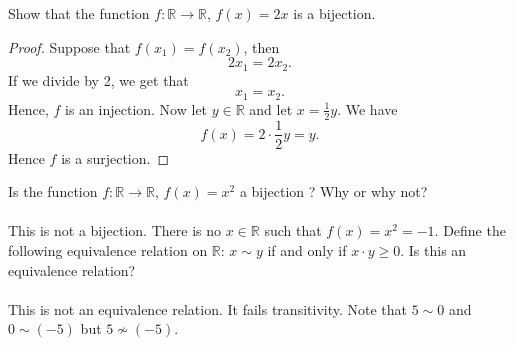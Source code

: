 \documentclass[11pt]{exam}
\theoremstyle{definition}
\begin{document}
\begin{questions}
\question Show that the function $f:\mathbb{R}\rightarrow \mathbb{R}$, $f(x)=2x$  is a bijection. 
\begin{proof} Suppose that $f(x_1)=f(x_2)$, then 
\[2x_1=2x_2.\]
If we divide by 2, we get that 
\[x_1=x_2.\] Hence, $f$ is an injection. Now let $y\in \mathbb{R}$ and let $x=\frac{1}{2}y$. We have 
\[f(x)=2\cdot \frac{1}{2}y= y.\]
Hence $f$ is a surjection. 
\end{proof}
\vfill
\question Is the function $f:\mathbb{R}\rightarrow \mathbb{R}$, $f(x)=x^2$ a bijection ? Why or why not? \\
\ \\
This is not a bijection. There is no $x\in \mathbb{R}$ such that $f(x)=x^2=-1$. 
\vspace{2.5 in}
\newpage
Define the following equivalence relation on $\mathbb{R}$: $x\sim y$ if and only if $x\cdot y\geq 0$. Is this an equivalence relation?\\
\ \\
This is not an equivalence relation. It fails transitivity. Note that $5\sim 0$ and $0\sim (-5)$ but $5\not \sim (-5)$.
\end{questions}
\end{document}
